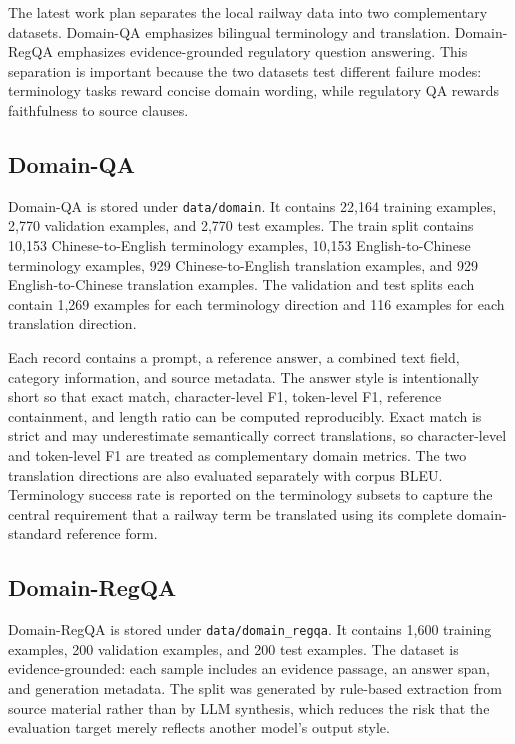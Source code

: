 \label{sec:datasets}

The latest work plan separates the local railway data into two complementary
datasets. Domain-QA emphasizes bilingual terminology and translation.
Domain-RegQA emphasizes evidence-grounded regulatory question answering. This
separation is important because the two datasets test different failure modes:
terminology tasks reward concise domain wording, while regulatory QA rewards
faithfulness to source clauses.



\subsection{Domain-QA}

Domain-QA is stored under \texttt{data/domain}. It contains 22,164 training
examples, 2,770 validation examples, and 2,770 test examples. The train split
contains 10,153 Chinese-to-English terminology examples, 10,153
English-to-Chinese terminology examples, 929 Chinese-to-English translation
examples, and 929 English-to-Chinese translation examples. The validation and
test splits each contain 1,269 examples for each terminology direction and 116
examples for each translation direction.

Each record contains a prompt, a reference answer, a combined text field,
category information, and source metadata. The answer style is intentionally
short so that exact match, character-level F1, token-level F1, reference
containment, and length ratio can be computed reproducibly. Exact match is
strict and may underestimate semantically correct translations, so
character-level and token-level F1 are treated as complementary domain metrics.
The two translation directions are also evaluated separately with corpus BLEU.
Terminology success rate is reported on the terminology subsets to capture the
central requirement that a railway term be translated using its complete
domain-standard reference form.

\subsection{Domain-RegQA}

Domain-RegQA is stored under \texttt{data/domain\_regqa}. It contains 1,600
training examples, 200 validation examples, and 200 test examples. The dataset
is evidence-grounded: each sample includes an evidence passage, an answer span,
and generation metadata. The split was generated by rule-based extraction from
source material rather than by LLM synthesis, which reduces the risk that the
evaluation target merely reflects another model's output style.

